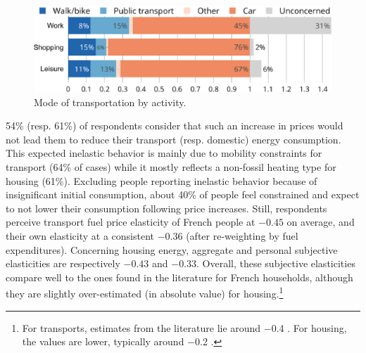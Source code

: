 \documentclass[english,5p,authoryear]{elsarticle}
\begin{document}
\begin{figure}[b]
\centering
\includegraphics[width=\columnwidth]{Images_EPS/transports_use_trim.eps}
\caption{Mode of transportation by activity.}
\label{fig:transports_use}
\end{figure}

54\% (resp. 61\%) of respondents consider that such an increase in prices would not lead them to reduce their transport (resp. domestic) energy consumption. This expected inelastic behavior is mainly due to mobility constraints for transport (64\% of cases) while it mostly reflects a non-fossil heating type for housing (61\%). Excluding people reporting inelastic behavior because of insignificant initial consumption, about 40\% of people feel constrained and expect to not lower their consumption following price increases. Still, respondents perceive transport fuel price elasticity of French people at $-0.45$ on average, and their own elasticity at a consistent $-0.36$ (after re-weighting by fuel expenditures). Concerning housing energy, aggregate and personal subjective elasticities are respectively $-0.43$ and $-0.33$. Overall, these subjective elasticities compare well to the ones found in the literature for French households, although they are slightly over-estimated (in absolute value) for housing.\footnote{For transports, estimates from the literature lie around $-$0.4 \citep{clerc_marcus,bureau_distributional_2011,douenne_vertical_2018}. For housing, the values are lower, typically around $-$0.2 \citep{douenne_vertical_2018,clerc_marcus}.}


\end{document}

